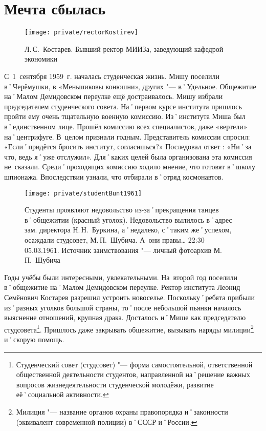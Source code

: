 ﻿\chapter{Мечта сбылась}

\begin{wrapfigure}{O}{.4\textwidth}
\centering
\texttt{[image: private/rectorKostirev]}
\caption[Л.\,С.~Костарев. Бывший ректор МИИЗа, заведующий кафедрой экономики]{Л.\,С.~Костарев. Бывший ректор МИИЗа, заведующий кафедрой экономики\footnotemark}
\label{fig:rectorKostirev}
\end{wrapfigure}

С~1~сентября 1959~г. началась студенческая жизнь. Мишу поселили в˚Черёмушки, в «Меньшиковы конюшни», других "--- в˚Удельное. Общежитие на˚Малом Демидовском переулке ещё достраивалось. Мишу избрали председателем студенческого совета. На˚первом курсе института пришлось пройти ему очень тщательную военную комиссию. Из˚института Миша был в˚единственном лице. Прошёл комиссию всех специалистов, даже «вертели» на˚центрифуге. В~целом признали годным. Представитель комиссии спросил: «Если˚придётся бросить институт, согласишься?» Последовал ответ : «Ни˚за что, ведь я˚уже отслужил». Для˚каких целей была организована эта комиссия не~сказали. Среди˚проходящих комиссию ходило мнение, что готовят в˚школу шпионажа. Впоследствии узнали, что отбирали в˚отряд космонавтов.

\begin{figure}[h!]
\texttt{[image: private/studentBunt1961]}
\caption[Студенты проявляют недовольство из-за˚прекращения танцев в˚общежитии (красный уголок). Недовольство вылилось в˚адрес зам. директора Н.\,Н.~Буркина, а˚недалеко, с˚таким же˚успехом, осаждали студсовет, М.\,П.~Шубича. А~они правы… 22:30 05.03.1961]{Студенты проявляют недовольство из-за˚прекращения танцев в˚общежитии (красный уголок). Недовольство вылилось в˚адрес зам. директора Н.\,Н.~Буркина, а˚недалеко, с˚таким же˚успехом, осаждали студсовет, М.\,П.~Шубича. А~они правы… 22:30 05.03.1961. Источник заимствования "--- личный фотоархив М.\,П.~Шубича}
\label{fig:studentBunt1961}
\end{figure}

Годы учёбы были интересными, увлекательными. На~второй год поселили в˚общежитие на˚Малом Демидовском переулке. Ректор института Леонид Семёнович Костарев разрешил устроить новоселье. Поскольку˚ребята прибыли из˚разных уголков большой страны, то˚после небольшой пьянки началось выяснение отношений, крупная драка. Досталось и˚Мише как председателю студсовета\footnote{Студенческий совет (студсовет) "--- форма самостоятельной, ответственной общественной деятельности студентов, направленной на˚решение важных вопросов жизнедеятельности студенческой молодёжи, развитие её˚социальной активности.}. Пришлось даже закрывать общежитие, вызывать наряды милиции\footnote{Милиция "--- название органов охраны правопорядка и˚законности (эквивалент современной полиции) в˚СССР и˚России.} и˚скорую помощь.

